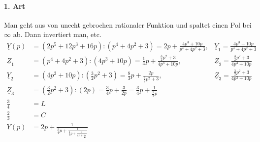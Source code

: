 \paragraph{1. Art}
Man geht aus von unecht gebrochen rationaler Funktion und
spaltet einen Pol bei $\infty$ ab. Dann invertiert man, etc.
\begin{align}
	\underline{Y}(p)&=\left(2p^5+12p^3+16p\right):\left(p^4+4p^2+3\right)=2p+\frac{4p^3+10p}{p^4+4p^2+3},
	&\underline{Y}_1=\frac{4p^3+10p}{p^4+4p^2+3}\nonumber\\
	\underline{Z}_1&=\left(p^4+4p^2+3\right):\left(4p^3+10p\right)=\frac{1}{4}p+\frac{\frac{3}{2}p^2+3}{4p^3+10p},
	&\underline{Z}_2=\frac{\frac{3}{2}p^2+3}{4p^3+10p}\nonumber\\
	\underline{Y}_2&=\left(4p^3+10p\right):\left(\frac{3}{2}p^2+3\right)=\frac{8}{3}p+\frac{2p}{\frac{3}{2}p^2+3},
	&\underline{Z}_3=\frac{\frac{3}{2}p^2+3}{4p^3+10p}\nonumber\\
	\underline{Z}_3&=\left(\frac{3}{2}p^2+3\right):\left(2p\right)=\frac{3}{4}p+\frac{3}{2p}=\frac{3}{4}p+\frac{1}{\frac{2}{3}p}\nonumber\\
	\frac{3}{4}&=L\nonumber\\
	\frac{2}{3}&=C\nonumber\\
	\underline{Y}(p)&=2p+\frac{1}{\frac{1}{4}p+\frac{1}{\frac{8}{3}p+\frac{1}{\frac{3}{4}p+\frac{1}{\frac{2}{3}p}}}}\nonumber
\end{align}

